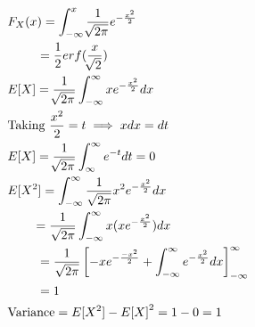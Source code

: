 \documentclass[journal,12pt,twocolumn]{IEEEtran}
\renewcommand\thesection{\arabic{section}}
\begin{document}
\begin{enumerate}[label=\thesection.\arabic*
,ref=\thesection.\theenumi]
\begin{align}
        &F_X(x) = \int_{-\infty}^{x} \frac{1}{\sqrt[]{2\pi}}e^{-\frac{x^2}{2}}\\
        &~~~~~~~= \frac{1}{2} erf(\frac{x}{\sqrt[]{2}})\\
        &E[X] = \frac{1}{\sqrt[]{2\pi}}\int_{-\infty}^{\infty}xe^{-\frac{x^2}{2}}dx\\
        &\text{Taking  }\frac{x^2}{2} = t \implies x dx = dt\\
        &E[X] = \frac{1}{\sqrt[]{2\pi}}\int_{\infty}^{\infty}e^{-t}dt = 0\\
        &E[X^2]=\int_{-\infty}^{\infty} \frac{1}{\sqrt{2\pi}} x^2e^{-\frac{x^2}{2}} dx\\
        &~~~~~~=\frac{1}{\sqrt{2\pi}}\int_{-\infty}^{\infty}  x(xe^{-\frac{x^2}{2}}) dx\\
        &~~~~~~~= \frac{1}{\sqrt{2\pi}} {}\left[-xe^{-\frac{-x^2}{2}}+\int_{-\infty}^{\infty} e^{-\frac{x^2}{2}} dx\right]^{\infty}_{-\infty}\\
        &~~~~~~~= 1\\
        &\text{Variance} = E[X^2] - {E[X]}^2 = 1 - 0 = 1
    \end{align}
    \end{enumerate}
\end{document}
